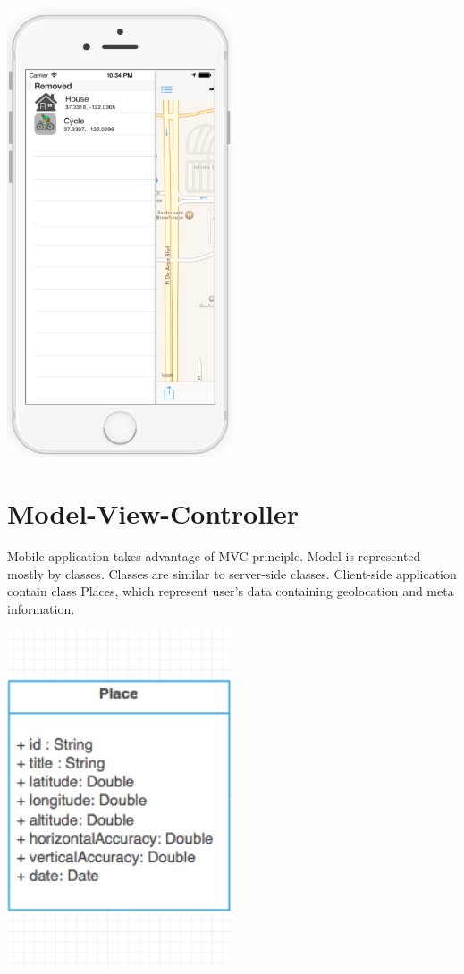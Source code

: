 \documentclass[thesis=M,english]{FITthesis}[2012/10/20]
\begin{document}
\begin{center}
\includegraphics[width=0.5\textwidth]{images/screenshots/removed_places_device}

\end{center}


\section{Model-View-Controller}

Mobile application takes advantage of MVC principle. Model is represented mostly by classes. Classes are similar to server-side classes. Client-side application contain class Places, which represent user's data containing geolocation and meta information.

\begin{center}
\includegraphics[width=0.5\textwidth]{images/uml/uml_places}
\end{center}
\end{document}
